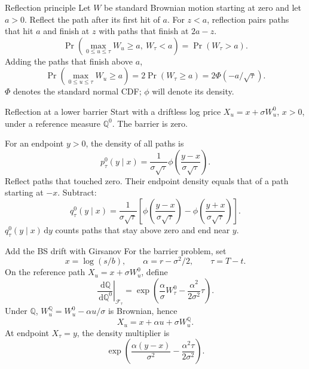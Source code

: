 \documentclass[handout,10pt,t,aspectratio=169]{beamer}
\newcommand{\Q}{\mathbb Q}
\newcommand{\dd}{\,\mathrm d}
\begin{document}
\begin{frame}{Reflection principle}
\small
Let \(W\) be standard Brownian motion starting at zero and let \(a>0\).
Reflect the path after its first hit of \(a\).
For \(z<a\), reflection pairs paths that hit \(a\) and finish at \(z\)
with paths that finish at \(2a-z\).
\[
 \Pr\!\left(\max_{0\leq u\leq\tau}W_u\geq a,\ W_\tau<a\right)
 =\Pr(W_\tau>a).
\]
Adding the paths that finish above \(a\),
\[
 \boxed{\Pr\!\left(\max_{0\leq u\leq\tau}W_u\geq a\right)
 =2\Pr(W_\tau\geq a)=2\Phi(-a/\sqrt\tau).}
\]
\(\Phi\) denotes the standard normal CDF; \(\phi\) will denote its density.
\end{frame}

\begin{frame}{Reflection at a lower barrier}
\small
Start with a driftless log price \(X_u=x+\sigma W_u^0\), \(x>0\),
under a reference measure \(\Q^0\). The barrier is zero.

For an endpoint \(y>0\), the density of all paths is
\[
 p_\tau^0(y\mid x)=\frac1{\sigma\sqrt\tau}
 \phi\!\left(\frac{y-x}{\sigma\sqrt\tau}\right).
\]
Reflect paths that touched zero. Their endpoint density equals that
of a path starting at \(-x\). Subtract:
\[
 \boxed{q_\tau^0(y\mid x)=\frac1{\sigma\sqrt\tau}
 \left[\phi\!\left(\frac{y-x}{\sigma\sqrt\tau}\right)
 -\phi\!\left(\frac{y+x}{\sigma\sqrt\tau}\right)\right].}
\]
\(q_\tau^0(y\mid x)\dd y\) counts paths that stay above zero and end near \(y\).
\end{frame}

\begin{frame}{Add the BS drift with Girsanov}
\small
For the barrier problem, set
\[
 x=\log(s/b),\qquad \alpha=r-\sigma^2/2,\qquad\tau=T-t.
\]
On the reference path \(X_u=x+\sigma W_u^0\), define
\[
 \left.\frac{\dd\Q}{\dd\Q^0}\right|_{\mathcal F_\tau}
 =\exp\!\left(\frac\alpha\sigma W_\tau^0
             -\frac{\alpha^2}{2\sigma^2}\tau\right).
\]
Under \(\Q\), \(W_u^\Q=W_u^0-\alpha u/\sigma\) is Brownian, hence
\[
 X_u=x+\alpha u+\sigma W_u^\Q.
\]
At endpoint \(X_\tau=y\), the density multiplier is
\[
 \boxed{\exp\!\left(\frac{\alpha(y-x)}{\sigma^2}
                    -\frac{\alpha^2\tau}{2\sigma^2}\right).}
\]
\end{frame}
\end{document}
